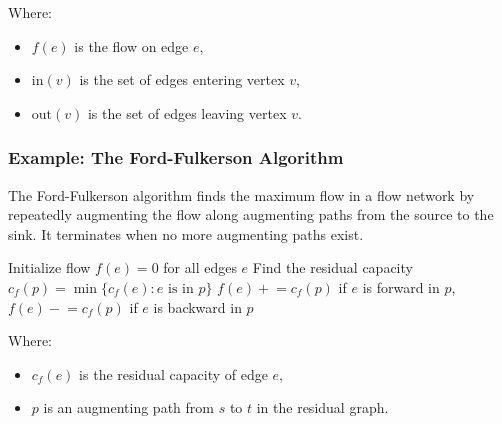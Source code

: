\documentclass[12pt]{book} %
\begin{document}
Where:
\begin{itemize}
    \item \(f(e)\) is the flow on edge \(e\),
    \item \(\text{in}(v)\) is the set of edges entering vertex \(v\),
    \item \(\text{out}(v)\) is the set of edges leaving vertex \(v\).
\end{itemize}


\subsubsection{Example: The Ford-Fulkerson Algorithm}

The Ford-Fulkerson algorithm finds the maximum flow in a flow network by repeatedly augmenting the flow along augmenting paths from the source to the sink. It terminates when no more augmenting paths exist.
\FloatBarrier
\begin{algorithm}[H]
\caption{Ford-Fulkerson Algorithm}\label{alg:ford-fulkerson}
\begin{algorithmic}[1]
    \State Initialize flow $f(e) = 0$ for all edges $e$
        \State Find the residual capacity $c_f(p) = \min\{c_f(e) : e \text{ is in } p\}$
            \State $f(e) \mathrel{+}= c_f(p)$ if $e$ is forward in $p$, $f(e) \mathrel{-}= c_f(p)$ if $e$ is backward in $p$
        \EndFor
    \EndWhile
\EndProcedure
\end{algorithmic}
\end{algorithm}
\FloatBarrier
Where:
\begin{itemize}
    \item $c_f(e)$ is the residual capacity of edge $e$,
    \item $p$ is an augmenting path from $s$ to $t$ in the residual graph.
\end{itemize}
\end{document}
